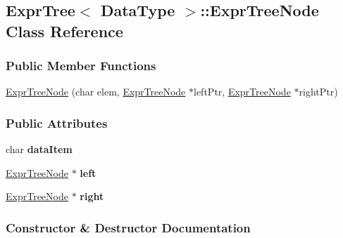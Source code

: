 \hypertarget{class_expr_tree_1_1_expr_tree_node}{}\subsection{Expr\+Tree$<$ Data\+Type $>$\+:\+:Expr\+Tree\+Node Class Reference}
\label{class_expr_tree_1_1_expr_tree_node}
\subsubsection*{Public Member Functions}
\begin{DoxyCompactItemize}
\item 
\hyperlink{class_expr_tree_1_1_expr_tree_node_a377132931c65d935746d2fa5d223eee7}{Expr\+Tree\+Node} (char elem, \hyperlink{class_expr_tree_1_1_expr_tree_node}{Expr\+Tree\+Node} $\ast$left\+Ptr, \hyperlink{class_expr_tree_1_1_expr_tree_node}{Expr\+Tree\+Node} $\ast$right\+Ptr)
\end{DoxyCompactItemize}
\subsubsection*{Public Attributes}
\begin{DoxyCompactItemize}
\item 
char {\bfseries data\+Item}\hypertarget{class_expr_tree_1_1_expr_tree_node_a8985f5eb0eb91c438c186a1d55116783}{}\label{class_expr_tree_1_1_expr_tree_node_a8985f5eb0eb91c438c186a1d55116783}

\item 
\hyperlink{class_expr_tree_1_1_expr_tree_node}{Expr\+Tree\+Node} $\ast$ {\bfseries left}\hypertarget{class_expr_tree_1_1_expr_tree_node_ac35c0fb63d2f0a2d5cd761ffd3c25262}{}\label{class_expr_tree_1_1_expr_tree_node_ac35c0fb63d2f0a2d5cd761ffd3c25262}

\item 
\hyperlink{class_expr_tree_1_1_expr_tree_node}{Expr\+Tree\+Node} $\ast$ {\bfseries right}\hypertarget{class_expr_tree_1_1_expr_tree_node_a7af02913a798115ad57793c470262c04}{}\label{class_expr_tree_1_1_expr_tree_node_a7af02913a798115ad57793c470262c04}

\end{DoxyCompactItemize}


\subsubsection{Constructor \& Destructor Documentation}
